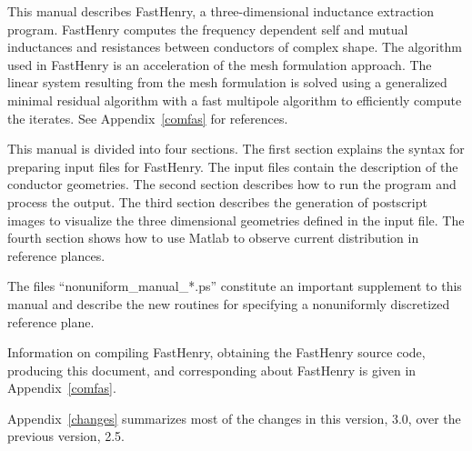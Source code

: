 This manual describes FastHenry, a three-dimensional inductance
extraction program.  FastHenry computes the frequency dependent self
and mutual inductances and resistances between conductors of complex
shape.  The algorithm used in FastHenry is an acceleration of the mesh
formulation approach.  The linear system resulting from the mesh
formulation is solved using a generalized minimal residual algorithm
with a fast multipole algorithm to efficiently compute the
iterates. See Appendix~\ref{comfas} for references.

This manual is divided into four sections.  The first section explains
the syntax for preparing input files for FastHenry.  The input files contain the
description of the conductor geometries.
The second section describes how to run the program and process the output.
The third section describes the generation of postscript images to
visualize the three dimensional geometries defined in the input file.
The fourth section shows how to use Matlab to observe current
distribution in reference plances.

The files ``nonuniform\_manual\_*.ps'' constitute  an important
supplement to this 
manual and describe the new routines for specifying a nonuniformly
discretized reference plane.

Information on compiling FastHenry, obtaining the FastHenry source
code, producing this document, and 
corresponding about FastHenry is given in
Appendix~\ref{comfas}. 

Appendix~\ref{changes} summarizes most of the  changes in this
version, 3.0, over the previous version, 2.5.


